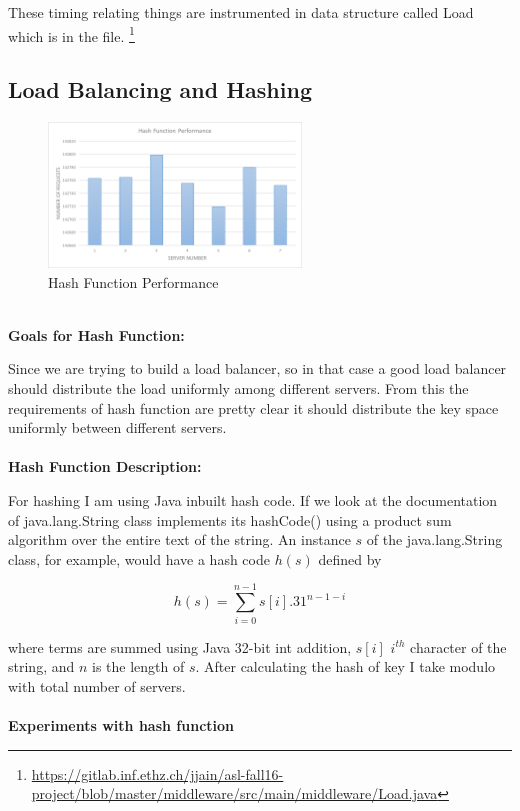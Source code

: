 \documentclass[11pt]{article}
\begin{document}
These timing relating things are instrumented in data structure called Load which is in the file.
\footnote{\url{https://gitlab.inf.ethz.ch/jjain/asl-fall16-project/blob/master/middleware/src/main/middleware/Load.java}}

\subsection{Load Balancing and Hashing}\label{sec:desc:hashing}

\begin{figure}[h]
    \centering
    \includegraphics[width=0.6\textwidth]{hash.png}
    \caption{Hash Function Performance}
    \label{fig:hash}
\end{figure}

\textbf{\\ Goals for Hash Function:}

Since we are trying to build a load balancer, so in that case a good load balancer should distribute the load uniformly among different servers. From this the requirements of hash function are pretty clear it should distribute the key space uniformly between different servers.
\\ \\
\textbf{Hash Function Description: } 

For hashing I am using Java inbuilt hash code. If we look at the documentation of java.lang.String class implements its hashCode() using a product sum algorithm over the entire text of the string. An instance $s$ of the java.lang.String class, for example, would have a hash code $h(s)$ defined by

$$h(s) = \sum_{i=0}^{n-1} s[i]. 31^{n-1-i} $$

where terms are summed using Java 32-bit int addition, $s[i]$ $i^{th}$ character of the string, and  $n$ is the length of $s$. After calculating the hash of key I take modulo with total number of servers.
\\ \\
\textbf{Experiments with hash function}
\end{document}
